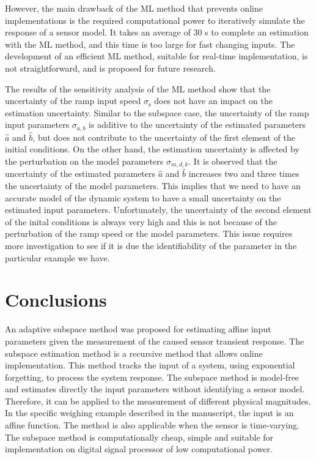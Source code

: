 {{However, the main drawback of the ML method that prevents online implementations is the required computational power to iteratively simulate the response of a sensor model.
It takes an average of 30 s to complete an estimation with the ML method, and this time is too large for fast changing inputs.
The development of an efficient ML method, suitable for real-time implementation, is not straightforward, and is proposed for future research.

The results of the sensitivity analysis of the ML method show that the uncertainty of the ramp input speed $\sigma_{\mathrm{s}}$ does not have an impact on the estimation uncertainty.
Similar to the subspace case, the uncertainty of the ramp input parameters $\sigma_{a,b}$ is additive to the uncertainty of the estimated parameters $\widehat{a}$ and $\widehat{b}$, but does not contribute to the uncertainty of the first element of the initial conditions.
On the other hand, the estimation uncertainty is affected by the perturbation on the model parameters $\sigma_{m,d,k}$.
It is observed that the uncertainty of the estimated parameters $\widehat{a}$ and $\widehat{b}$ increases two and three times the uncertainty of the model parameters.
This implies that we need to have an accurate model of the dynamic system to have a small uncertainty on the estimated input parameters.
Unfortunately, the uncertainty of the second element of the inital conditions is always very high and this is not because of the perturbation of the ramp speed or the model parameters. 
This issue requires more investigation to see if it is due the identifiability of the parameter in the particular example we have.


\section{Conclusions}

An adaptive subspace method was proposed for estimating affine input parameters given the measurement of the caused sensor transient response. 
The subspace estimation method is a recursive method that allows online implementation.
This method tracks the input of a system, using exponential forgetting, to process the system response.
The subspace method is model-free and estimates directly the input parameters without identifying a sensor model.
Therefore, it can be applied to the measurement of different physical magnitudes.
In the specific weighing example described in the manuscript, the input is an affine function.
The method is also applicable when the sensor is time-varying.
The subspace method is computationally cheap, simple and suitable for implementation on digital signal processor of low computational power. 

}}
